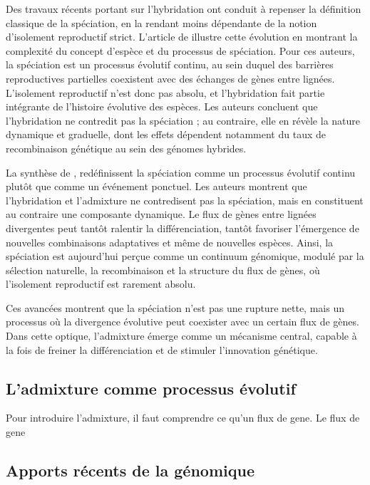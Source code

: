 \documentclass[12pt,a4paper]{article}
\begin{document}
Des travaux récents portant sur l’hybridation ont conduit à repenser la définition classique de la spéciation, en la rendant moins dépendante de la notion d’isolement reproductif strict. L’article de \textcite{schumer2018natural} illustre cette évolution en montrant la complexité du concept d’espèce et du processus de spéciation. Pour ces auteurs, la spéciation est un processus évolutif continu, au sein duquel des barrières reproductives partielles coexistent avec des échanges de gènes entre lignées.
L’isolement reproductif n’est donc pas absolu, et l’hybridation fait partie intégrante de l’histoire évolutive des espèces. Les auteurs concluent que l’hybridation ne contredit pas la spéciation ; au contraire, elle en révèle la nature dynamique et graduelle, dont les effets dépendent notamment du taux de recombinaison génétique au sein des génomes hybrides.

La synthèse de \textcite{Penalbaetal2024_HybridizationReview}, redéfinissent la spéciation comme un processus évolutif continu plutôt que comme un événement ponctuel. Les auteurs montrent que l’hybridation et l’admixture ne contredisent pas la spéciation, mais en constituent au contraire une composante dynamique. Le flux de gènes entre lignées divergentes peut tantôt ralentir la différenciation, tantôt favoriser l’émergence de nouvelles combinaisons adaptatives et même de nouvelles espèces. Ainsi, la spéciation est aujourd’hui perçue comme un continuum génomique, modulé par la sélection naturelle, la recombinaison et la structure du flux de gènes, où l’isolement reproductif est rarement absolu.

Ces avancées montrent que la spéciation n’est pas une rupture nette, mais un processus où la divergence évolutive peut coexister avec un certain flux de gènes.
Dans cette optique, l’admixture émerge comme un mécanisme central, capable à la fois de freiner la différenciation et de stimuler l’innovation génétique.
\subsection{L’admixture comme processus évolutif}
Pour introduire l'admixture, il faut comprendre ce qu'un flux de gene.
Le flux de gene
\subsection{Apports récents de la génomique}
\end{document}
